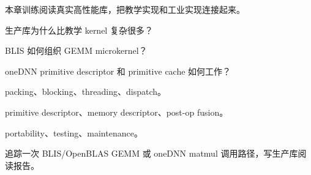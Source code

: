 {本章训练阅读真实高性能库，把教学实现和工业实现连接起来。}
{\item 生产库为什么比教学 kernel 复杂很多？
\item BLIS 如何组织 GEMM microkernel？
\item oneDNN primitive descriptor 和 primitive cache 如何工作？}
{\item packing、blocking、threading、dispatch。
\item primitive descriptor、memory descriptor、post-op fusion。
\item portability、testing、maintenance。}
{追踪一次 BLIS/OpenBLAS GEMM 或 oneDNN matmul 调用路径，写生产库阅读报告。}
